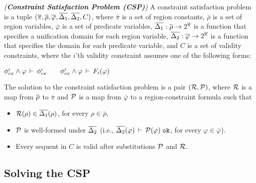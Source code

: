 \begin{definition}
\emph{(\textbf{Constraint Satisfaction Problem (CSP)})}
A constraint satisfaction problem is a tuple
$(\overline{\pi}, \overline{\rho}, \overline{\varphi}, \overline{\Delta_1}, \overline{\Delta_2}, C)$,
where $\bar{\pi}$ is a set of region constants,
$\bar{\rho}$ is a set of region variables,
$\bar{\varphi}$ is a set of predicate variables,
$\overline{\Delta_1} : \overline{\rho} \rightarrow 2^{\overline{\pi}}$ is a function that
specifies a unification domain for each region variable,
$\overline{\Delta_2} : \overline{\varphi} \rightarrow 2^{\overline{\pi}}$ is a function that
specifies the domain for each predicate variable,
and $C$ is a set of validity constraints, where the $i$'th validity constraint
assumes one of the following forms:
\begin{center}
\(
    \phi_{cx}^{i} \wedge \varphi\,\vdash\,\phi_{cs}^{i}\qquad
    \phi_{cx}^{i} \wedge \varphi\,\vdash\,F_i(\varphi)
\)
\end{center}
The solution to the constraint satisfaction problem is a pair $(\mathcal{R},\mathcal{P})$,
where $\mathcal{R}$ is a map from $\overline{\rho}$ to $\bar{\pi}$
and $\mathcal{P}$ is a map from $\bar{\varphi}$ to a region-constraint formula such that
\begin{itemize}
  \item $\mathcal{R}(\rho) \in \overline{\Delta_1}(\rho)$, for every $\rho \in \bar{\rho}$,

  \item $\mathcal{P}$ is well-formed under $\overline{\Delta_2}$
    (i.e., $\overline{\Delta_2}(\varphi)\,\vdash\,\mathcal{P}(\varphi) \; \texttt{ok}$, for every $\varphi \in \bar{\varphi}$).

  \item Every sequent in $C$ is valid after substitutions $\mathcal{P}$ and $
    \mathcal{R}$.
\end{itemize}
\end{definition}

\subsection{Solving the CSP}

